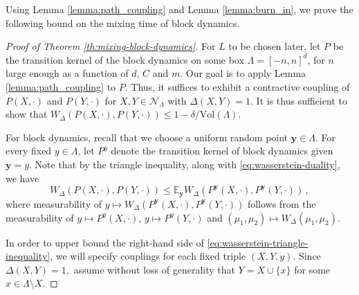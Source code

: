 \documentclass[10pt]{amsart}
\theoremstyle{definition}
\theoremstyle{remark}
\newcommand{\pointsets}{\mathcal{N}}
\newcommand{\E}{\mathbb{E}}
\newcommand{\region}{\Lambda}
\newcommand{\vol}{\mathrm{Vol}}
\newcommand{\randpoint}{\mathbf{y}}
\begin{document}
	Using Lemma \ref{lemma:path_coupling} and Lemma \ref{lemma:burn_in}, we prove the following bound on the mixing time of block dynamics.
	\begin{proof}[Proof of Theorem \ref{th:mixing-block-dynamics}]
		For $L$ to be chosen later, let $P$ be the transition kernel of the block dynamics on some box $\region = [-n, n]^d$, for $n$ large enough as a function of $d$, $C$ and $m$.
		Our goal is to apply Lemma \ref{lemma:path_coupling} to $P$.
		Thus, it suffices to exhibit a contractive coupling of $P(X, \cdot)$ and $P(Y, \cdot)$ for $X, Y \in \pointsets_{\region}$ with $\Delta(X,Y) = 1$.  It is thus sufficient to show that $W_\Delta(P(X,\cdot), P(Y,\cdot)) \leq 1 - \delta/\vol(\Lambda)$. 
		
		For block dynamics, recall that we choose a uniform random point $\randpoint \in \Lambda$.  
		For every fixed $y \in \region$, let $P^y$ denote the transition kernel of block dynamics given $\randpoint = y$. 
		Note that by the triangle inequality, along with \eqref{eq:wasserstein-duality}, we have
		\begin{equation}\label{eq:wasserstein-triangle-inequality}
			W_\Delta(P(X,\cdot),P(Y,\cdot)) \leq \E_{\randpoint} W_\Delta(P^{\randpoint}(X,\cdot),P^{\randpoint}(Y,\cdot))\,,
		\end{equation}
		where measurability of $y \mapsto W_\Delta(P^{\randpoint}(X,\cdot),P^{\randpoint}(Y,\cdot))$ follows from the measurability of $y \mapsto P^{y}(X,\cdot)$, $y \mapsto P^{y}(Y,\cdot)$ and $(\mu_1, \mu_2) \mapsto W_{\Delta}(\mu_1, \mu_2)$.
		
		In order to upper bound the right-hand side of \eqref{eq:wasserstein-triangle-inequality}, we will specify couplings for each fixed triple $(X,Y,y)$.  
		Since $\Delta(X,Y) = 1,$ assume without loss of generality that $Y = X \cup \{x\}$ for some $x \in \Lambda \setminus X.$  
		

\end{proof}
\end{document}
